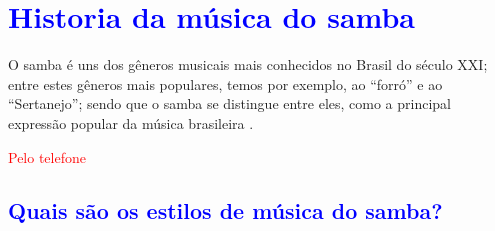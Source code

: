 
\chapter{\textcolor{blue}{Historia da música do samba}}

O samba é uns dos gêneros musicais mais conhecidos no Brasil do século XXI;
entre estes gêneros mais populares, temos por exemplo, ao ``forró'' e ao ``Sertanejo'';
sendo que o samba se distingue entre eles, 
como a principal expressão popular da música brasileira \cite[pp. 47]{diniz2008almanaque}. 

\textcolor{red}{Pelo telefone\cite{musicapelotelefone}}
 \cite[pp. 290]{dourado2004dicionario}

\section{\textcolor{blue}{Quais são os estilos de música do samba?}}

